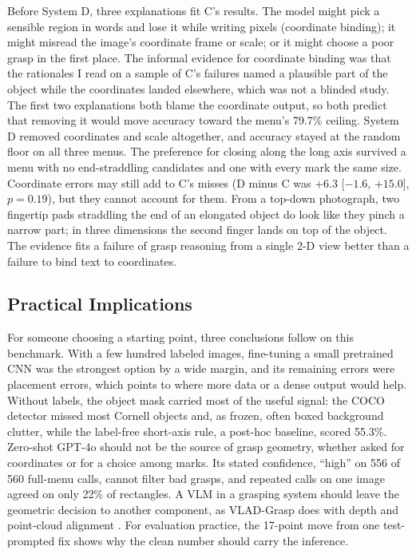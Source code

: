 \documentclass[10pt,conference,compsoc]{IEEEtran}
\begin{document}
Before System D, three explanations fit C's results. The model might pick a
sensible region in words and lose it while writing pixels (coordinate
binding); it might misread the image's coordinate frame or scale; or it might
choose a poor grasp in the first place. The informal evidence for coordinate
binding was that the rationales I read on a sample of C's failures named a
plausible part of the object while the coordinates landed elsewhere, which
was not a blinded study. The first two explanations both blame the
coordinate output, so both predict that removing it would move accuracy
toward the menu's 79.7\% ceiling. System D removed coordinates and scale
altogether, and accuracy stayed at the random floor on all three menus. The
preference for closing along the long axis survived a menu with no
end-straddling candidates and one with every mark the same size. Coordinate
errors may still add to C's misses (D minus C was $+6.3$ [$-1.6$, $+15.0$],
$p=0.19$), but they cannot account for them. From a top-down photograph, two
fingertip pads straddling the end of an elongated object do look like they
pinch a narrow part; in three dimensions the second finger lands on top of
the object. The evidence fits a failure of grasp reasoning from a single 2-D
view better than a failure to bind text to coordinates.

\subsection{Practical Implications}

For someone choosing a starting point, three conclusions follow on this
benchmark. With a few hundred labeled images, fine-tuning a small pretrained
CNN was the strongest option by a wide margin, and its remaining errors were
placement errors, which points to where more data or a dense output would
help. Without labels, the object mask carried most of the useful signal: the
COCO detector missed most Cornell objects and, as frozen, often boxed
background clutter, while the label-free short-axis rule, a post-hoc
baseline, scored 55.3\%.
Zero-shot GPT-4o should not be the source of grasp geometry, whether asked
for coordinates or for a choice among marks. Its stated confidence, ``high'' on
556 of 560 full-menu calls, cannot filter bad grasps, and repeated calls on
one image agreed on only 22\% of rectangles. A VLM in a grasping system
should leave the geometric decision
to another component, as VLAD-Grasp does with depth and point-cloud
alignment \cite{kulshrestha2025}. For evaluation practice, the 17-point move
from one test-prompted fix shows why the clean number should carry the
inference.
\end{document}
